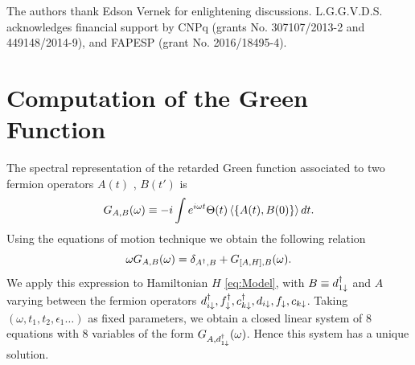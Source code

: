 \documentclass[showpacs,aps,prb,reprint,superscriptaddress]{revtex4-2}
\newcommand{\LUIS}[1]{\textcolor{blue}{\fbox{Luis} {\sl#1}}}
\begin{document}
%
%




\begin{acknowledgments}
The authors thank Edson Vernek for enlightening discussions.  L.G.G.V.D.S. acknowledges financial support by CNPq (grants No. 307107/2013-2 and 449148/2014-9), and FAPESP (grant No. 2016/18495-4).
\end{acknowledgments}







 \appendix

 
 \section{Computation of the Green Function  \label{sec:Appendix_alg}}


 The spectral representation of the retarded Green function  \cite{zubarev_double-time_1960} associated to two fermion operators $A(t)$ , $B(t')$ is 
 \begin{equation}
 G_{A,B}(\omega) \equiv-i \int e^{i \omega t} \Theta(t)\left\langle\{A(t), B(0)\}\right\rangle d t. 
\end{equation}
Using the equations of motion technique we obtain the following relation \cite{zubarev_double-time_1960}
\begin{equation}
    \omega G_{A,B}(\omega)=\delta_{A^{\dagger},B}+G_{\left[A,H\right],B}(\omega).
    \label{eq:Transport}
\end{equation}
\noindent We apply this expression to Hamiltonian $H$ \eqref{eq:Model}, with $B \equiv d^\dagger_{1\downarrow}$ and $A$ varying between the fermion operators $d^\dagger_{i\downarrow}, f^\dagger_\downarrow,c^\dagger_{k\downarrow}, d_{i\downarrow},f_\downarrow ,c_{k\downarrow}$. Taking $(\omega,t_1,t_2,\epsilon_1 \ldots)$ as fixed parameters, we obtain a closed linear system of $8$  equations with $8$ variables of the form $G_{A,d^\dagger_{1\downarrow}}(\omega)$. Hence this system has a unique solution. 
\end{document}
